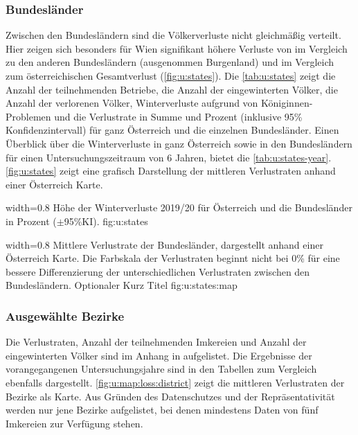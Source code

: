 \subsubsection{Bundesländer}

Zwischen den Bundesländern sind die Völkerverluste nicht gleichmäßig verteilt. Hier zeigen sich besonders für Wien signifikant höhere Verluste von  im Vergleich zu den anderen Bundesländern (ausgenommen Burgenland) und im Vergleich zum österreichischen Gesamtverlust (\cref{fig:u:states}). Die \cref{tab:u:states} zeigt die Anzahl der teilnehmenden Betriebe, die Anzahl der eingewinterten Völker, die Anzahl der verlorenen Völker, Winterverluste aufgrund von Königinnen-Problemen und die Verlustrate in Summe und Prozent (inklusive 95\% Konfidenzintervall) für ganz Österreich und die einzelnen Bundesländer. Einen Überblick über die Winterverluste in ganz Österreich sowie in den Bundesländern für einen Untersuchungszeitraum von 6 Jahren, bietet die \cref{tab:u:states-year}. \cref{fig:u:states} zeigt eine grafisch Darstellung der mittleren Verlustraten anhand einer Österreich Karte.

  {width=0.8\textwidth} %
  {Höhe der Winterverluste 2019/20 für Österreich und die Bundesländer in Prozent ($\pm$95\%KI).} %
  {} %
  {fig:u:states} %




  {width=0.8\textwidth} %
  {Mittlere Verlustrate der Bundesländer, dargestellt anhand einer Österreich Karte. Die Farbskala der Verlustraten beginnt nicht bei 0\% für eine bessere Differenzierung der unterschiedlichen Verlustraten zwischen den Bundesländern.} %
  {Optionaler Kurz Titel} %
  {fig:u:states:map} %


\subsubsection{Ausgewählte Bezirke}

Die Verlustraten, Anzahl der teilnehmenden Imkereien und Anzahl der eingewinterten Völker sind im Anhang in  aufgelistet. Die Ergebnisse der vorangegangenen Untersuchungsjahre sind in den Tabellen zum Vergleich ebenfalls dargestellt. \cref{fig:u:map:loss:district} zeigt die mittleren Verlustraten der Bezirke als Karte. Aus Gründen des Datenschutzes und der Repräsentativität werden nur jene Bezirke aufgelistet, bei denen mindestens Daten von fünf Imkereien zur Verfügung stehen.

